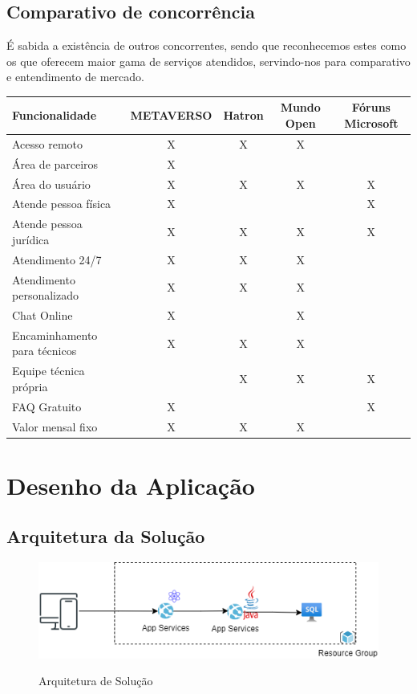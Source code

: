 \documentclass[
    12pt,               %
    openright,          %
    oneside,
    a4paper,            %
    english,            %
    brazil              %
   ]{ifsp-spo-inf-ctds}
\begin{document}
    
    \section{Comparativo de concorrência}
    É sabida a existência de outros concorrentes, sendo que reconhecemos estes como os que oferecem maior gama de serviços atendidos, servindo-nos para comparativo e entendimento de mercado.
    
    \begin{table}
        \begin{tabular}{l c c c c}
            \hline
            Funcionalidade          & METAVERSO & Hatron & Mundo Open & Fóruns Microsoft \\
            \hline
            Acesso remoto           & X       & X   & X &   \\
            Área de parceiros   & X   &     &   &   \\
            Área do usuário & X & X & X & X\\
            Atende pessoa física & X &   &   & X\\
            Atende pessoa jurídica & X & X & X & X\\
            Atendimento 24/7 & X & X & X &  \\
            Atendimento personalizado & X & X & X &  \\
            Chat Online & X &   & X &  \\
            Encaminhamento para técnicos & X & X & X &  \\
            Equipe técnica própria &   & X & X & X\\
            FAQ Gratuito & X &   &   & X\\
            Valor mensal fixo & X & X & X &  \\
            \hline

        \end{tabular}
    \end{table}

\chapter[Desenho da Aplicação]{Desenho da Aplicação}

\section{Arquitetura da Solução}
\begin{figure}[h]
\caption{Arquitetura de Solução}

\centering %
\includegraphics[width=15cm]{anexos/arquitetura_v1.png} %
\label{figura:desenhodearquitetura}
\end{figure}
\end{document}
